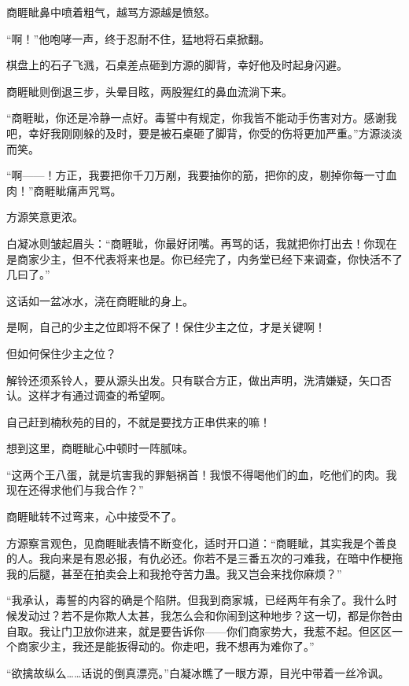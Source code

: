 
\begin{this_body}



商睚眦鼻中喷着粗气，越骂方源越是愤怒。

“啊！”他咆哮一声，终于忍耐不住，猛地将石桌掀翻。

棋盘上的石子飞溅，石桌差点砸到方源的脚背，幸好他及时起身闪避。

商睚眦则倒退三步，头晕目眩，两股猩红的鼻血流淌下来。

“商睚眦，你还是冷静一点好。毒誓中有规定，你我皆不能动手伤害对方。感谢我吧，幸好我刚刚躲的及时，要是被石桌砸了脚背，你受的伤将更加严重。”方源淡淡而笑。

“啊——！方正，我要把你千刀万剐，我要抽你的筋，把你的皮，剔掉你每一寸血肉！”商睚眦痛声咒骂。

方源笑意更浓。

白凝冰则皱起眉头：“商睚眦，你最好闭嘴。再骂的话，我就把你打出去！你现在是商家少主，但不代表将来也是。你已经完了，内务堂已经下来调查，你快活不了几曰了。”

这话如一盆冰水，浇在商睚眦的身上。

是啊，自己的少主之位即将不保了！保住少主之位，才是关键啊！

但如何保住少主之位？

解铃还须系铃人，要从源头出发。只有联合方正，做出声明，洗清嫌疑，矢口否认。这样才有通过调查的希望啊。

自己赶到楠秋苑的目的，不就是要找方正串供来的嘛！

想到这里，商睚眦心中顿时一阵腻味。

“这两个王八蛋，就是坑害我的罪魁祸首！我恨不得喝他们的血，吃他们的肉。我现在还得求他们与我合作？”

商睚眦转不过弯来，心中接受不了。

方源察言观色，见商睚眦表情不断变化，适时开口道：“商睚眦，其实我是个善良的人。我向来是有恩必报，有仇必还。你若不是三番五次的刁难我，在暗中作梗拖我的后腿，甚至在拍卖会上和我抢夺苦力蛊。我又岂会来找你麻烦？”

“我承认，毒誓的内容的确是个陷阱。但我到商家城，已经两年有余了。我什么时候发动过？若不是你欺人太甚，我怎么会和你闹到这种地步？这一切，都是你咎由自取。我让门卫放你进来，就是要告诉你——你们商家势大，我惹不起。但区区一个商家少主，我还是能扳得动的。你走吧，我不想再为难你了。”

“欲擒故纵么……话说的倒真漂亮。”白凝冰瞧了一眼方源，目光中带着一丝冷讽。


\end{this_body}
